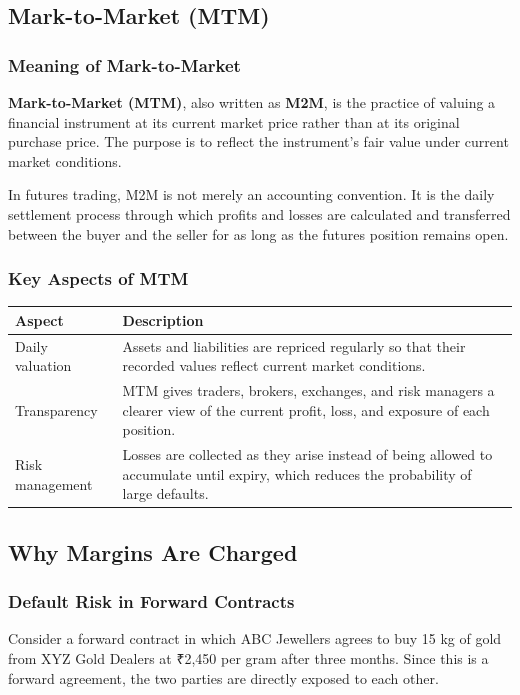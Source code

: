 \documentclass[12pt,openany]{book}
\begin{document}
\subsection{Mark-to-Market (MTM)}

\subsubsection{Meaning of Mark-to-Market}
\textbf{Mark-to-Market (MTM)}, also written as \textbf{M2M}, is the practice of valuing a financial instrument at its current market price rather than at its original purchase price. The purpose is to reflect the instrument's fair value under current market conditions.

In futures trading, M2M is not merely an accounting convention. It is the daily settlement process through which profits and losses are calculated and transferred between the buyer and the seller for as long as the futures position remains open.

\subsubsection{Key Aspects of MTM}

\begin{center}
\small
\begin{tabular}{|L{0.24\textwidth}|L{0.62\textwidth}|}
\hline
\textbf{Aspect} & \textbf{Description} \\ \hline
Daily valuation & Assets and liabilities are repriced regularly so that their recorded values reflect current market conditions. \\ \hline
Transparency & MTM gives traders, brokers, exchanges, and risk managers a clearer view of the current profit, loss, and exposure of each position. \\ \hline
Risk management & Losses are collected as they arise instead of being allowed to accumulate until expiry, which reduces the probability of large defaults. \\ \hline
\end{tabular}
\end{center}

\subsection{Why Margins Are Charged}

\subsubsection{Default Risk in Forward Contracts}
Consider a forward contract in which ABC Jewellers agrees to buy 15 kg of gold from XYZ Gold Dealers at ₹2,450 per gram after three months. Since this is a forward agreement, the two parties are directly exposed to each other.
\end{document}
